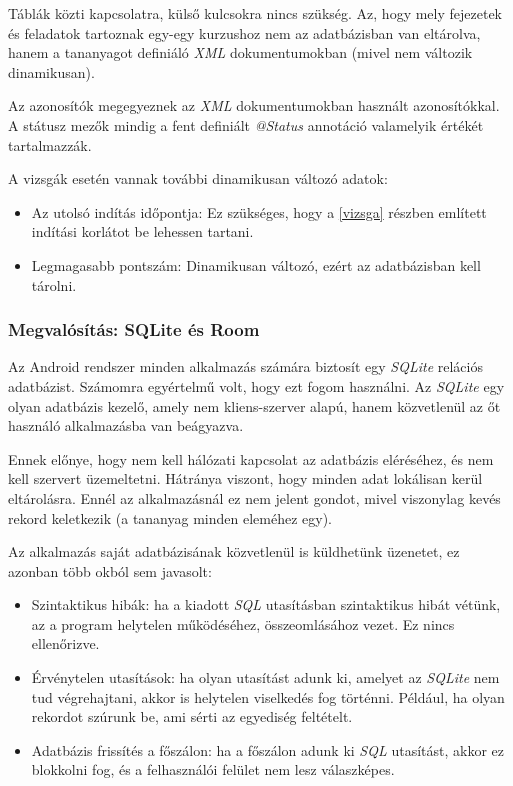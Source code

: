 \documentclass[12pt,a4paper]{article}
\newcommand{\xml}{\textit{XML}\xspace}
\begin{document}
	Táblák közti kapcsolatra, külső kulcsokra nincs szükség. Az, hogy mely fejezetek és feladatok tartoznak egy-egy kurzushoz nem az adatbázisban van eltárolva, hanem a tananyagot definiáló \xml dokumentumokban (mivel nem változik dinamikusan).
	
	Az azonosítók megegyeznek az \xml dokumentumokban használt azonosítókkal. A státusz mezők mindig a fent definiált \textit{@Status} annotáció valamelyik értékét tartalmazzák.
	
	A vizsgák esetén vannak további dinamikusan változó adatok:
	
	\begin{itemize}
		\item Az utolsó indítás időpontja: Ez szükséges, hogy a \ref{vizsga} részben említett indítási korlátot be lehessen tartani.
		\item Legmagasabb pontszám: Dinamikusan változó, ezért az adatbázisban kell tárolni.
	\end{itemize}
	
	\subsubsection{Megvalósítás: SQLite és Room}\label{sqlite_roon}

	Az Android rendszer minden alkalmazás számára biztosít egy \textit{SQLite} relációs adatbázist. Számomra egyértelmű volt, hogy ezt fogom használni. Az \textit{SQLite} egy olyan adatbázis kezelő, amely nem kliens-szerver alapú, hanem közvetlenül az őt használó alkalmazásba van beágyazva. 
	
	Ennek előnye, hogy nem kell hálózati kapcsolat az adatbázis eléréséhez, és nem kell szervert üzemeltetni. Hátránya viszont, hogy minden adat lokálisan kerül eltárolásra. Ennél az alkalmazásnál ez nem jelent gondot, mivel viszonylag kevés rekord keletkezik (a tananyag minden eleméhez egy).
	
	Az alkalmazás saját adatbázisának közvetlenül is küldhetünk üzenetet, ez azonban több okból sem javasolt:
	
	\begin{itemize}
		\item Szintaktikus hibák: ha a kiadott \textit{SQL} utasításban szintaktikus hibát vétünk, az a program helytelen működéséhez, összeomlásához vezet. Ez nincs ellenőrizve.
		\item Érvénytelen utasítások: ha olyan utasítást adunk ki, amelyet az \textit{SQLite} nem tud végrehajtani, akkor is helytelen viselkedés fog történni. Például, ha olyan rekordot szúrunk be, ami sérti az egyediség feltételt.
		\item Adatbázis frissítés a főszálon: ha a főszálon adunk ki \textit{SQL} utasítást, akkor ez blokkolni fog, és a felhasználói felület nem lesz válaszképes. 
	\end{itemize}
\end{document}
